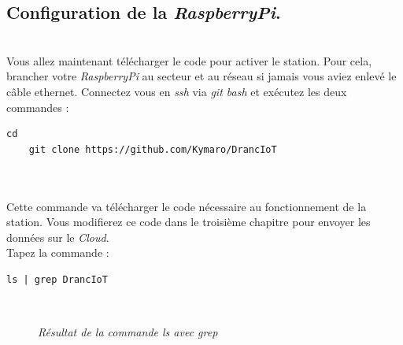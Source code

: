 \subsection{Configuration de la \textit{RaspberryPi}.}\\

Vous allez maintenant télécharger le code pour activer le station. Pour cela, brancher votre \textit{RaspberryPi} au secteur et au réseau si jamais vous aviez enlevé le câble ethernet. Connectez vous en \textit{ssh} via \textit{git bash} et exécutez les deux commandes :\\
		\begin{lstlisting}[style=MyBashStyle]
	cd
	git clone https://github.com/Kymaro/DrancIoT
		\end{lstlisting}\\

\\
Cette commande va télécharger le code nécessaire au fonctionnement de la station. Vous modifierez ce code dans le troisième chapitre pour envoyer les données sur le \textit{Cloud}.
\\

Tapez la commande :\\

\begin{lstlisting}[style=MyBashStyle]
	ls | grep DrancIoT
\end{lstlisting}\\

\begin{figure}[H]
\begin{center}
\end{center}
	\caption{ \textit{Résultat de la commande ls avec grep}}
\end{figure}\\ 

